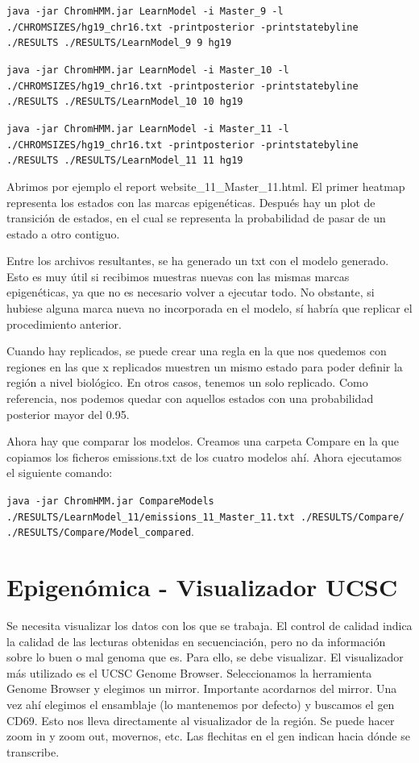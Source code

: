 \texttt{java -jar ChromHMM.jar LearnModel -i Master\_9 -l ./CHROMSIZES/hg19\_chr16.txt -printposterior -printstatebyline ./RESULTS ./RESULTS/LearnModel\_9 9 hg19}

\texttt{java -jar ChromHMM.jar LearnModel -i Master\_10 -l ./CHROMSIZES/hg19\_chr16.txt -printposterior -printstatebyline ./RESULTS ./RESULTS/LearnModel\_10 10 hg19}

\texttt{java -jar ChromHMM.jar LearnModel -i Master\_11 -l ./CHROMSIZES/hg19\_chr16.txt -printposterior -printstatebyline ./RESULTS ./RESULTS/LearnModel\_11 11 hg19}

Abrimos por ejemplo el report website\_11\_Master\_11.html. El primer heatmap representa los estados con las marcas epigenéticas. Después hay un plot de transición de estados, en el cual se representa la probabilidad de pasar de un estado a otro contiguo. 

Entre los archivos resultantes, se ha generado un txt con el modelo generado. Esto es muy útil si recibimos muestras nuevas con las mismas marcas epigenéticas, ya que no es necesario volver a ejecutar todo. No obstante, si hubiese alguna marca nueva no incorporada en el modelo, sí habría que replicar el procedimiento anterior.

Cuando hay replicados, se puede crear una regla en la que nos quedemos con regiones en las que x replicados muestren un mismo estado para poder definir la región a nivel biológico. En otros casos, tenemos un solo replicado. Como referencia, nos podemos quedar con aquellos estados con una probabilidad posterior mayor del 0.95. 

Ahora hay que comparar los modelos. Creamos una carpeta Compare en la que copiamos los ficheros emissions.txt de los cuatro modelos ahí. Ahora ejecutamos el siguiente comando:

\texttt{java -jar ChromHMM.jar CompareModels ./RESULTS/LearnModel\_11/emissions\_11\_Master\_11.txt
./RESULTS/Compare/
./RESULTS/Compare/Model\_compared}.

\section{Epigenómica - Visualizador UCSC}
Se necesita visualizar los datos con los que se trabaja. El control de calidad indica la calidad de las lecturas obtenidas en secuenciación, pero no da información sobre lo buen o mal genoma que es. Para ello, se debe visualizar. El visualizador más utilizado es el UCSC Genome Browser. Seleccionamos la herramienta Genome Browser y elegimos un mirror. Importante acordarnos del mirror. Una vez ahí elegimos el ensamblaje (lo mantenemos por defecto) y buscamos el gen CD69. Esto nos lleva directamente al visualizador de la región. Se puede hacer zoom in y zoom out, movernos, etc. Las flechitas en el gen indican hacia dónde se transcribe. 

